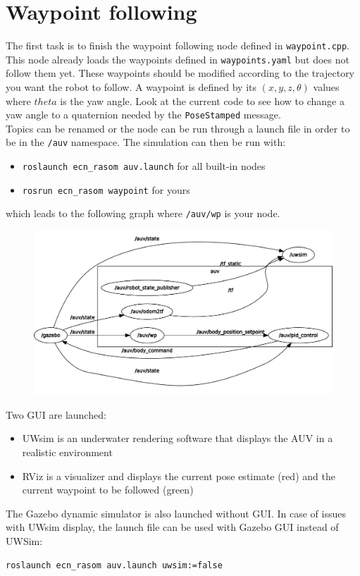 \documentclass{ecnreport}
\begin{document}
\section{Waypoint following}

The first task is to finish the waypoint following node defined in \texttt{waypoint.cpp}. This node already loads the waypoints defined in \texttt{waypoints.yaml} but does not follow them yet.
These waypoints should be modified according to the trajectory you want the robot to follow. A waypoint is defined by its $(x,y,z,\theta)$ values where $theta$ is the yaw angle. Look at the current
code to see how to change a yaw angle to a quaternion needed by the \texttt{PoseStamped} message.\\

Topics can be renamed or the node can be run through a launch file in order to be in the \texttt{/auv} namespace.
The simulation can then be run with:
\begin{itemize}
 \item \texttt{roslaunch ecn\_rasom auv.launch} for all built-in nodes
 \item \texttt{rosrun ecn\_rasom waypoint} for yours
\end{itemize}
which leads to the following graph where \texttt{/auv/wp} is your node.
\begin{figure}[h]\centering
 \includegraphics[width=.8\linewidth]{graph_wp}
\end{figure}

Two GUI are launched: 
\begin{itemize}
 \item UWsim is an underwater rendering software that displays the AUV in a realistic environment
 \item RViz is a visualizer and displays the current pose estimate (red) and the current waypoint to be followed (green)
\end{itemize}
The Gazebo dynamic simulator is also launched without GUI. In case of issues with UWsim display, the launch file can be used with Gazebo GUI instead of UWSim:
\begin{center}
\begin{lstlisting}
roslaunch ecn_rasom auv.launch uwsim:=false
  \end{lstlisting}
  \end{center}
\end{document}
